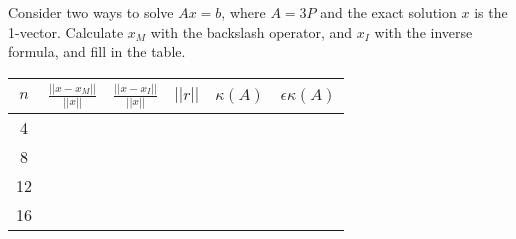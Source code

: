 \documentclass{article}
\begin{document}
Consider two ways to solve $Ax = b$, where $A = 3P$ and the exact solution $x$ is the 1-vector. Calculate $x_M$ with the backslash operator, and $x_I$ with the inverse formula, and fill in the table.


\begin{table}[h!]
\centering
\begin{tabular}{c |c| c | c |c |c}
  $n$ & $\frac{||x-x_M||}{||x||}$ & $\frac{||x-x_I||}{||x||}$ & $||r||$ & $\kappa(A)$ & $\epsilon\kappa(A)$ \\ [0.8ex]
\hline 
  4 &  &  &  &  & \\[0.5ex]\hline 
  8 &  &  &  &  & \\[0.5ex]\hline 
  12 &  &  &  &  & \\[0.5ex]\hline 
  16 &  &  &  &  & \\[0.5ex]
\end{tabular}
\end{table}
\end{document}
